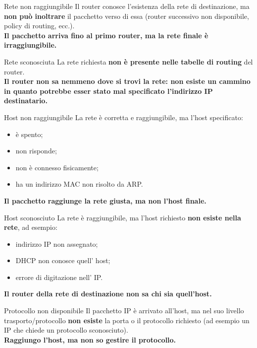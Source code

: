 \documentclass[a4paper,12pt]{report}
\begin{document}
\begin{defbox}{Rete non raggiungibile}
Il router conosce l'esistenza della rete di destinazione, ma \textbf{non può inoltrare} il pacchetto 
verso di essa (router successivo non disponibile, policy di routing, ecc.).
\\[4pt]
\textbf{Il pacchetto arriva fino al primo router, ma la rete finale è irraggiungibile.}
\end{defbox}

\begin{defbox}{Rete sconosciuta}
La rete richiesta \textbf{non è presente nelle tabelle di routing} del router.
\\[4pt]
\textbf{Il router non sa nemmeno dove si trovi la rete: non esiste un cammino  in quanto potrebbe esser stato mal specificato l'indirizzo IP destinatario.}
\end{defbox}

\begin{defbox}{Host non raggiungibile}
La rete è corretta e raggiungibile, ma l'host specificato:
\begin{itemize}
    \item è spento;
    \item non risponde;
    \item non è connesso fisicamente;
    \item ha un indirizzo MAC non risolto da ARP.
\end{itemize}
\textbf{Il pacchetto raggiunge la rete giusta, ma non l’host finale.}
\end{defbox}

\begin{defbox}{Host sconosciuto}
La rete è raggiungibile, ma l’host richiesto \textbf{non esiste nella rete}, ad esempio:
\begin{itemize}
    \item indirizzo IP non assegnato;
    \item DHCP non conosce quell’ host;
    \item errore di digitazione nell’ IP.
\end{itemize}
\textbf{Il router della rete di destinazione non sa chi sia quell’host.}
\end{defbox}

\begin{defbox}{Protocollo non disponibile}
Il pacchetto IP è arrivato all’host, ma nel suo livello trasporto/protocollo \textbf{non esiste} 
la porta o il protocollo richiesto (ad esempio un IP che chiede un protocollo sconosciuto).
\\[4pt]
\textbf{Raggiungo l'host, ma non so gestire il protocollo.}
\end{defbox}
\end{document}
